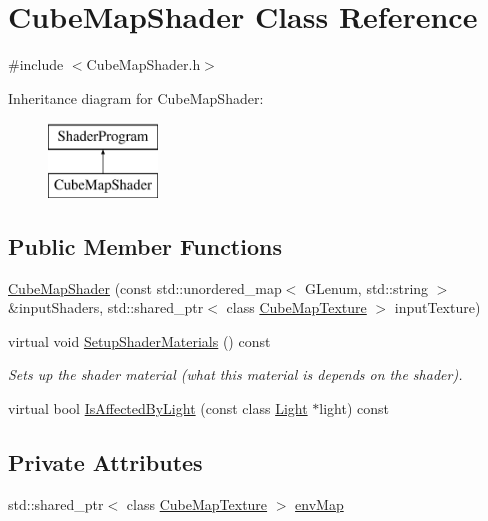 \hypertarget{class_cube_map_shader}{}\section{Cube\+Map\+Shader Class Reference}
\label{class_cube_map_shader}


{\ttfamily \#include $<$Cube\+Map\+Shader.\+h$>$}

Inheritance diagram for Cube\+Map\+Shader\+:\begin{figure}[H]
\begin{center}
\leavevmode
\includegraphics[height=2.000000cm]{class_cube_map_shader}
\end{center}
\end{figure}
\subsection*{Public Member Functions}
\begin{DoxyCompactItemize}
\item 
\hyperlink{class_cube_map_shader_abfd5fb870087965ef8d37323f7f9ed3a}{Cube\+Map\+Shader} (const std\+::unordered\+\_\+map$<$ G\+Lenum, std\+::string $>$ \&input\+Shaders, std\+::shared\+\_\+ptr$<$ class \hyperlink{class_cube_map_texture}{Cube\+Map\+Texture} $>$ input\+Texture)
\item 
virtual void \hyperlink{class_cube_map_shader_a9deaf42646258af9237751f331fb215a}{Setup\+Shader\+Materials} () const
\begin{DoxyCompactList}\small\item\em Sets up the shader material (what this material is depends on the shader). \end{DoxyCompactList}\item 
virtual bool \hyperlink{class_cube_map_shader_aa0c9e535cb18663acd9857165abc788f}{Is\+Affected\+By\+Light} (const class \hyperlink{class_light}{Light} $\ast$light) const
\end{DoxyCompactItemize}
\subsection*{Private Attributes}
\begin{DoxyCompactItemize}
\item 
std\+::shared\+\_\+ptr$<$ class \hyperlink{class_cube_map_texture}{Cube\+Map\+Texture} $>$ \hyperlink{class_cube_map_shader_ab9ea944d2b14c6a47406e36d9046caa6}{env\+Map}
\end{DoxyCompactItemize}
